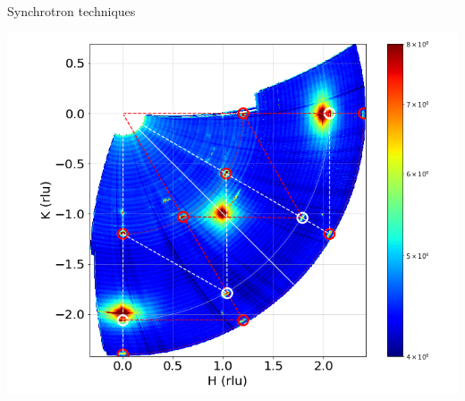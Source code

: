 \begin{frame}{Synchrotron techniques}
\begin{center}
\hspace{-0.5cm}
    {\includegraphics[height=0.55\textheight]{Figures/sxrd_data/maps/Map_hkl_surf_or_2227-2283.png}}
\end{center}    
    
\end{frame}